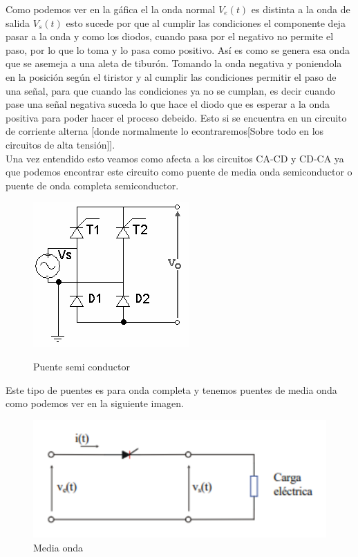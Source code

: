 \documentclass[letterpaper]{article}
\begin{document}
\begin{Large}
Como podemos ver en la gáfica el la onda normal $V_e(t)$ es distinta a la onda de salida $V_s(t)$ esto sucede por que al cumplir las condiciones el componente deja pasar a la onda y como los diodos, cuando pasa por el negativo no permite el paso, por lo que lo toma y lo pasa como positivo. Así es como se genera esa onda que se asemeja a una aleta de tiburón. Tomando la onda negativa y poniendola en la posición según el tiristor y al cumplir las condiciones permitir el paso de una señal, para que cuando las condiciones ya no se cumplan, es decir cuando pase una señal negativa suceda lo que hace el diodo que es esperar a la onda positiva para poder hacer el proceso debeido. Esto si se encuentra en un circuito de corriente alterna [donde normalmente lo econtraremos[Sobre todo en los circuitos de alta tensión]].\\


Una vez entendido esto veamos como afecta a los circuitos CA-CD y CD-CA ya que podemos encontrar este circuito como puente de media onda semiconductor o puente de onda completa semiconductor.\\
\begin{figure}[hbtp]
\centering
\includegraphics[scale=.5]{Imagenes/puente semi.png}\\
\caption{Puente semi conductor}
\end{figure}

Este tipo de puentes es para onda completa y tenemos puentes de media onda como podemos ver en la siguiente imagen.
\begin{figure}[hbtp]
\caption{Media onda}
\centering
\includegraphics[scale=.5]{Imagenes/media.png}
\end{figure}\\


\end{Large}
\end{document}

